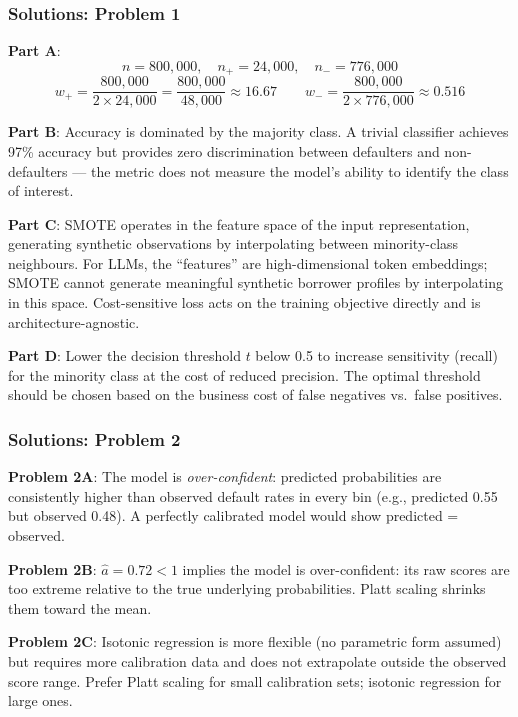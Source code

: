 \documentclass[9pt,t]{beamer}
\begin{document}
\begin{frame}
\frametitle{Solutions: Problem 1}

\textbf{Part A}:
\[
  n = 800{,}000, \quad n_+ = 24{,}000, \quad n_- = 776{,}000
\]
\[
  w_+ = \frac{800{,}000}{2 \times 24{,}000} = \frac{800{,}000}{48{,}000} \approx 16.67
  \qquad
  w_- = \frac{800{,}000}{2 \times 776{,}000} \approx 0.516
\]

\textbf{Part B}: Accuracy is dominated by the majority class. A trivial classifier achieves 97\% accuracy but provides zero discrimination between defaulters and non-defaulters — the metric does not measure the model's ability to identify the class of interest.

\textbf{Part C}: SMOTE operates in the feature space of the input representation, generating synthetic observations by interpolating between minority-class neighbours. For LLMs, the ``features'' are high-dimensional token embeddings; SMOTE cannot generate meaningful synthetic borrower profiles by interpolating in this space. Cost-sensitive loss acts on the training objective directly and is architecture-agnostic.

\textbf{Part D}: Lower the decision threshold $t$ below 0.5 to increase sensitivity (recall) for the minority class at the cost of reduced precision. The optimal threshold should be chosen based on the business cost of false negatives vs.\ false positives.
\end{frame}

\begin{frame}
\frametitle{Solutions: Problem 2}

\textbf{Problem 2A}: The model is \emph{over-confident}: predicted probabilities are consistently higher than observed default rates in every bin (e.g., predicted 0.55 but observed 0.48). A perfectly calibrated model would show predicted = observed.

\medskip
\textbf{Problem 2B}: $\hat{a} = 0.72 < 1$ implies the model is over-confident: its raw scores are too extreme relative to the true underlying probabilities. Platt scaling shrinks them toward the mean.

\medskip
\textbf{Problem 2C}: Isotonic regression is more flexible (no parametric form assumed) but requires more calibration data and does not extrapolate outside the observed score range. Prefer Platt scaling for small calibration sets; isotonic regression for large ones.
\end{frame}
\end{document}
